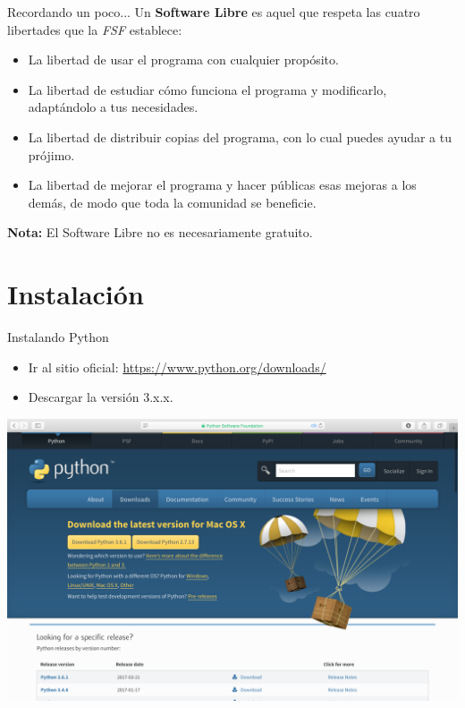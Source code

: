 \documentclass[usenames,dvipsnames]{beamer}
\begin{document}
  \begin{frame}{Recordando un poco...}
    Un \textbf{Software Libre} es aquel que respeta las cuatro libertades que
    la \textit{FSF} establece:
    \begin{itemize}
      \item La libertad de usar el programa con cualquier propósito.
      \item La libertad de estudiar cómo funciona el programa y modificarlo,
      adaptándolo a tus necesidades.
      \item La libertad de distribuir copias del programa, con lo cual puedes
      ayudar a tu prójimo.
      \item La libertad de mejorar el programa y hacer públicas esas mejoras a
      los demás, de modo que toda la comunidad se beneficie.
    \end{itemize}
    \textbf{Nota:} El Software Libre no es necesariamente gratuito.
  \end{frame}

  \section{Instalación}
  \begin{frame}{Instalando Python}
    \begin{itemize}
      \item Ir al sitio oficial: \url{https://www.python.org/downloads/}
      \item Descargar la versión 3.x.x.
    \end{itemize}
    \begin{center}
      \begin{tcolorbox}[beamer,
                  width=1.065\textheight,
                  arc=0pt,
                  boxsep=0pt,
                  left=0pt,right=0pt,top=0pt,bottom=0pt,
                  ]
        \includegraphics[scale=0.2]{imgs/download}
      \end{tcolorbox}
    \end{center}
  \end{frame}
\end{document}
